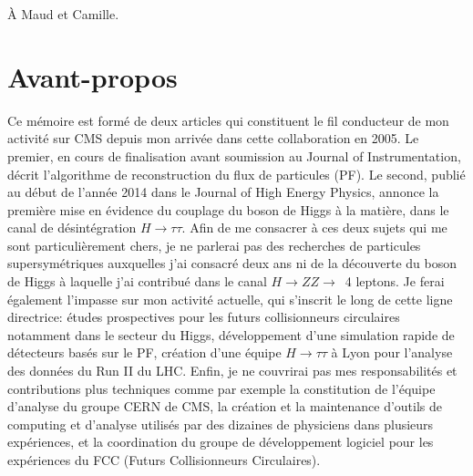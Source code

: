 \documentclass[11pt,twoside,a4paper,tdr]{cms-tdr}
\begin{document}
\newpage

\vspace*{10cm}
À Maud et Camille.

\newpage

\section*{Avant-propos}

Ce mémoire est formé de deux articles qui constituent le fil conducteur de mon activité sur CMS depuis mon arrivée dans cette collaboration en 2005. 
Le premier, en cours de finalisation avant soumission au Journal of Instrumentation, décrit l'algorithme de reconstruction du flux de particules (PF).
Le second, publié au début de l'année 2014 dans le Journal of High Energy Physics, annonce la première mise en évidence du couplage du boson de Higgs à la matière, dans le canal de désintégration $H \rightarrow \tau \tau$. 
Afin de me consacrer à ces deux sujets qui me sont particulièrement chers, 
je ne parlerai pas des recherches de particules supersymétriques auxquelles j'ai consacré deux ans
ni de la découverte du boson de Higgs à laquelle j'ai contribué dans le canal $H \rightarrow ZZ \rightarrow$~4 leptons. 
Je ferai également l'impasse sur mon activité actuelle, qui s'inscrit le long de cette ligne directrice: études prospectives pour les futurs collisionneurs circulaires notamment dans le secteur du Higgs, développement d'une simulation rapide de détecteurs basés sur le PF, 
création d'une équipe $H \rightarrow \tau \tau$ à Lyon pour l'analyse des données du Run II du LHC.
Enfin, je ne couvrirai pas mes responsabilités et contributions plus techniques comme par exemple la constitution de l'équipe d'analyse du groupe CERN de CMS, la création et la maintenance d'outils de computing et d'analyse utilisés par des dizaines de physiciens dans plusieurs expériences, et la coordination du groupe de développement logiciel pour les expériences du FCC (Futurs Collisionneurs Circulaires). 
\end{document}
